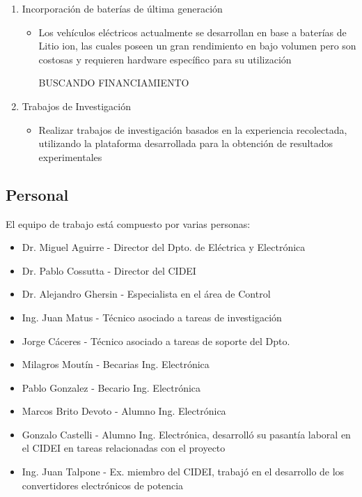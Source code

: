 \documentclass[a4paper]{article}
\begin{document}
\begin{enumerate}
    \item Incorporación de baterías de última generación
    \begin{itemize}
        \item Los vehículos eléctricos actualmente se desarrollan en base a baterías de Litio ion, las cuales poseen un gran rendimiento en bajo volumen pero son costosas y requieren hardware específico para su utilización \par BUSCANDO FINANCIAMIENTO
    \end{itemize}    
    \item Trabajos de Investigación
    \begin{itemize}
        \item Realizar trabajos de investigación basados en la experiencia recolectada, utilizando la plataforma desarrollada para la obtención de resultados experimentales
    \end{itemize}    
\end{enumerate}

\subsection{Personal}
El equipo de trabajo está compuesto por varias personas:
\begin{itemize}
    \item Dr. Miguel Aguirre - Director del Dpto. de Eléctrica y Electrónica
    \item Dr. Pablo Cossutta - Director del CIDEI
    \item Dr. Alejandro Ghersin - Especialista en el área de Control
    \item Ing. Juan Matus - Técnico asociado a tareas de investigación
    \item Jorge Cáceres - Técnico asociado a tareas de soporte del Dpto.
    \item Milagros Moutín - Becarias Ing. Electrónica
    \item Pablo Gonzalez - Becario Ing. Electrónica
    \item Marcos Brito Devoto - Alumno Ing. Electrónica
    \item Gonzalo Castelli - Alumno Ing. Electrónica, desarrolló su pasantía laboral en el CIDEI en tareas relacionadas con el proyecto
    \item Ing. Juan Talpone - Ex. miembro del CIDEI, trabajó en el desarrollo de los convertidores electrónicos de potencia
\end{itemize}
\end{document}
